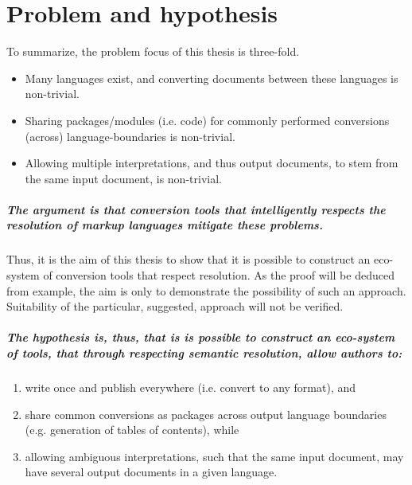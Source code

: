\documentclass{scrreprt}
\begin{document}
\chapter{Problem and hypothesis}
To summarize, the problem focus of this thesis is three-fold.

\begin{itemize}
\item Many languages exist, and converting documents between these languages is non-trivial.
\item Sharing packages/modules (i.e. code) for commonly performed conversions (across) language-boundaries is non-trivial.
\item Allowing multiple interpretations, and thus output documents, to stem from the same input document, is non-trivial.
\end{itemize}




\paragraph{The argument is that conversion tools that intelligently respects the resolution of markup languages mitigate these problems.} Thus, it is the aim of this thesis to show that it is possible to construct an eco-system of conversion tools that respect resolution. As the proof will be deduced from example, the aim is only to demonstrate the possibility of such an approach. Suitability of the particular, suggested, approach will not be verified.

\paragraph{The hypothesis is, thus, that is is possible to construct an eco-system of tools, that through respecting semantic resolution, allow authors to:}

\begin{enumerate}
\item write once and publish everywhere (i.e. convert to any format), and
\item share common conversions as packages across output language boundaries (e.g. generation of tables of contents), while
\item allowing ambiguous interpretations, such that the same input document, may have several output documents in a given language.
\end{enumerate}
\end{document}

